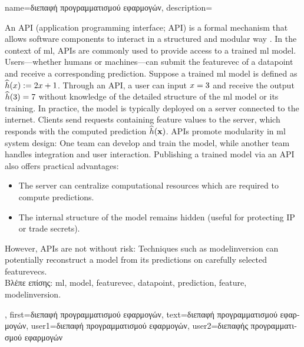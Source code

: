 {name={\foreignlanguage{greek}{διεπαφή προγραμματισμού εφαρμογών}},
		description={
			An  API (application programming interface; API) is a formal mechanism that 
			allows software components to interact in a structured and modular way \cite{RestfulBook2013}.
			In the context of \gls{ml}, APIs are commonly used to provide access to a trained \gls{ml} \gls{model}. 
			Users—whether humans or machines—can submit the \gls{featurevec} of a \gls{datapoint} and receive 
			a corresponding \gls{prediction}. Suppose a trained \gls{ml} \gls{model} is defined 
			as $\widehat{h}(x) := 2 x + 1$. Through an API, a user 
			can input $x = 3$ and receive the output $\widehat{h}(3) = 7$ 
			without knowledge of the detailed structure of the \gls{ml} \gls{model} or its training. 
			In practice, the \gls{model} is typically deployed on a server connected to the internet. 
			Clients send requests containing \gls{feature} values to the server, which responds with 
			the computed \gls{prediction} $\widehat{h}({\bf x})$. APIs promote modularity 
			in \gls{ml} system design: One team can develop and train the model, while another team
			handles integration and user interaction. Publishing a trained \gls{model} via an API also 
			offers practical advantages: 
			\begin{itemize} 
				\item The server can centralize computational resources which are required to compute \gls{prediction}s. 
		        \item The internal structure of the \gls{model} remains hidden (useful for protecting IP or trade secrets). 
		    \end{itemize} 
			However, APIs are not without \gls{risk}: Techniques such as \gls{modelinversion} can potentially reconstruct a 
			\gls{model} from its \gls{prediction}s on carefully selected \gls{featurevec}s.\\
			\foreignlanguage{greek}{Βλέπε επίσης:} \gls{ml}, \gls{model}, \gls{featurevec}, \gls{datapoint}, \gls{prediction}, \gls{feature}, \gls{modelinversion}.
			},
		first={\foreignlanguage{greek}{διεπαφή προγραμματισμού εφαρμογών}},
		text={\foreignlanguage{greek}{διεπαφή προγραμματισμού εφαρμογών}},
		user1={\foreignlanguage{greek}{διεπαφή προγραμματισμού εφαρμογών}}, %
		user2={\foreignlanguage{greek}{διεπαφής προγραμματισμού εφαρμογών}} %
}

